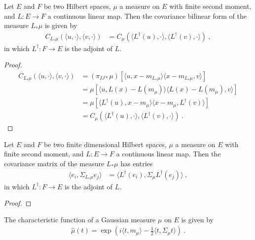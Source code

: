 \begin{lemma}\label{lem:covarianceBilin_map}
Let $E$ and $F$ be two Hilbert spaces, $\mu$ a measure on $E$ with finite second moment, and $L : E \to F$ a continuous linear map.
Then the covariance bilinear form of the measure $L_*\mu$ is given by
\begin{align*}
  C_{L_*\mu}(\langle u, \cdot\rangle, \langle v, \cdot\rangle)
  &= C_\mu(\langle L^\dagger(u), \cdot\rangle, \langle L^\dagger(v), \cdot\rangle)
  \: ,
\end{align*}
in which $L^\dagger : F \to E$ is the adjoint of $L$.
\end{lemma}

\begin{proof}
\begin{align*}
  C_{L_*\mu}(\langle u, \cdot\rangle, \langle v, \cdot\rangle)
  &= (\pi_{IJ*}\mu)\left[\langle u, x - m_{L_*\mu}\rangle \langle x - m_{L_*\mu}, v \rangle\right]
  \\
  &= \mu\left[\langle u, L(x) - L(m_\mu)\rangle \langle L(x) - L(m_\mu), v \rangle \right]
  \\
  &= \mu\left[\langle L^\dagger(u), x - m_\mu\rangle \langle x - m_\mu, L^\dagger(v) \rangle \right]
  \\
  &= C_\mu(\langle L^\dagger(u), \cdot\rangle, \langle L^\dagger(v), \cdot\rangle)
  \: .
\end{align*}
\end{proof}


\begin{lemma}\label{lem:covMatrix_map}
Let $E$ and $F$ be two finite dimensional Hilbert spaces, $\mu$ a measure on $E$ with finite second moment, and $L : E \to F$ a continuous linear map.
Then the covariance matrix of the measure $L_*\mu$ has entries
\begin{align*}
  \langle e_i, \Sigma_{L_*\mu} e_j\rangle
  &= \langle L^\dagger(e_i), \Sigma_\mu L^\dagger(e_j)\rangle
  \: ,
\end{align*}
in which $L^\dagger : F \to E$ is the adjoint of $L$.
\end{lemma}

\begin{proof}

\end{proof}


\begin{lemma}\label{lem:IsGaussian.charFun_eq}
The characteristic function of a Gaussian measure $\mu$ on $E$ is given by
\begin{align*}
  \hat{\mu}(t) = \exp\left(i \langle t, m_\mu \rangle - \frac{1}{2} \langle t, \Sigma_\mu t \rangle\right) \: .
\end{align*}
\end{lemma}


